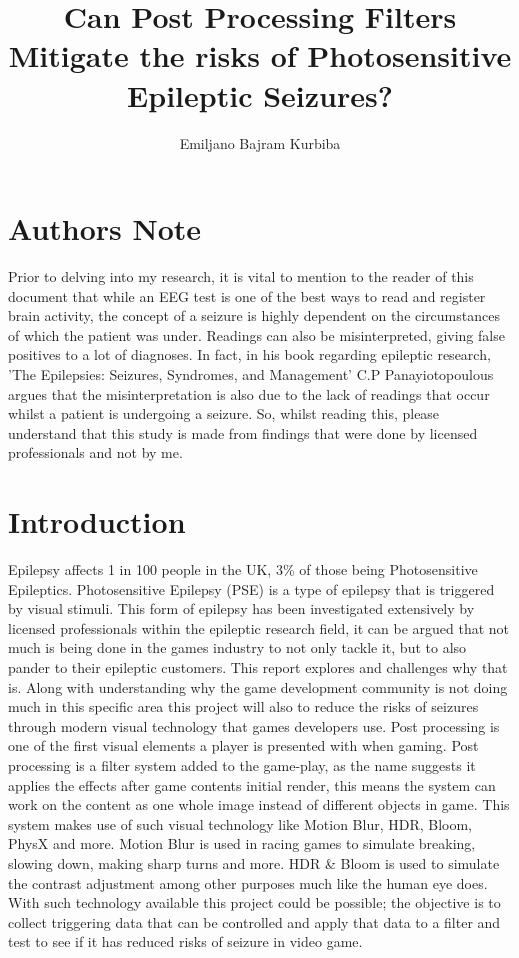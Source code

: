 \documentclass[twocolumn, 10pt, conference]{ieeetran}
\title{Can Post Processing Filters Mitigate the risks of Photosensitive Epileptic Seizures?}
\author{Emiljano Bajram Kurbiba}
\begin{document}
\maketitle

\section{Authors Note}
Prior to delving into my research, it is vital to mention to the reader of this document that while an EEG test is one of the best ways to read and register brain activity, the concept of a seizure is highly dependent on the circumstances of which the patient was under. Readings can also be misinterpreted, giving false positives to a lot of diagnoses. In fact, in his book regarding epileptic research, 'The Epilepsies: Seizures, Syndromes, and Management' \cite{panayiotopoulos2005epilepsies} C.P Panayiotopoulous argues that the misinterpretation is also due to the lack of readings that occur whilst a patient is undergoing a seizure. So, whilst reading this, please understand that this study is made from findings that were done by licensed professionals and not by me.

\section{Introduction}
Epilepsy affects 1 in 100 people in the UK, \cite{EpilepsyFacts} 3\% of those being Photosensitive Epileptics. Photosensitive Epilepsy (PSE) is a type of epilepsy that is triggered by visual stimuli. This form of epilepsy has been investigated extensively by licensed professionals within the epileptic research field, it can be argued that not much is being done in the games industry to not only tackle it, but to also pander to their epileptic customers. This report explores and challenges why that is. Along with understanding why the game development community is not doing much in this specific area this project will also to reduce the risks of seizures through modern visual technology that games developers use. Post processing is one of the first visual elements a player is presented with when gaming. Post processing is a filter system added to the game-play, as the name suggests it applies the effects after game contents initial render, this means the system can work on the content as one whole image instead of different objects in game. This system makes use of such visual technology like Motion Blur, HDR, Bloom, PhysX and more. Motion Blur is used in racing games to simulate breaking, slowing down, making sharp turns and more. HDR \& Bloom is used to simulate the contrast adjustment among other purposes much like the human eye does. With such technology available this project could be possible; the objective is to collect triggering data that can be controlled and apply that data to a filter and test to see if it has reduced risks of seizure in video game.
\end{document}
